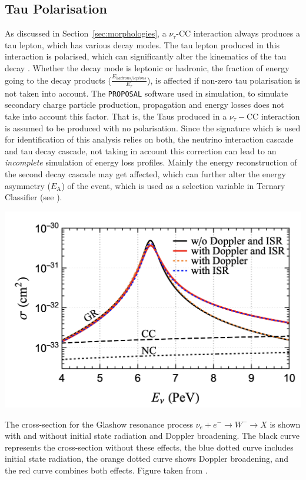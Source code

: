 \subsection{Tau Polarisation}
\label{sec:tau_polarisation}
As discussed in Section~\ref{sec:morphologies}, a $\nu_{\tau}$-CC interaction always produces a tau lepton, which has various decay modes. The tau lepton produced in this interaction is polarised, which can significantly alter the kinematics of the tau decay . Whether the decay mode is leptonic or hadronic, the fraction of energy going to the decay products ($\frac{E_{hadrons/leptons}}{E_{\tau}}$), is affected if non-zero tau polarisation is not taken into account. The \texttt{PROPOSAL} software used in simulation, to simulate secondary charge particle production, propagation and energy losses does not take into account this factor. That is, the Taus produced in a $\nu_{\tau}-$CC interaction is assumed to be produced with no polarisation. Since the signature which is used for identification of this analysis relies on both, the neutrino interaction cascade and tau decay cascade, not taking in account this correction can lead to an \emph{incomplete} simulation of energy loss profiles. Mainly the energy reconstruction of the second decay cascade may get affected, which can further alter the energy asymmetry ($E_{\mathrm{A}}$) of the event, which is used as a selection variable in Ternary Classifier (see ). 
\begin{marginfigure}
	\includegraphics{./figures/EventSample/ISR_glashow.png}
	\caption[The cross-section for the Glashow resonance process with and without initial state radiation and Doppler broadening]{The cross-section for the Glashow resonance process \(\nu_e +e^- \to W^- \to X\) is shown with and without initial state radiation and Doppler broadening. The black curve represents the cross-section without these effects, the blue dotted curve includes initial state radiation, the orange dotted curve shows Doppler broadening, and the red curve combines both effects. Figure taken from \cite{glashow_correcttion1}.}
\end{marginfigure}
